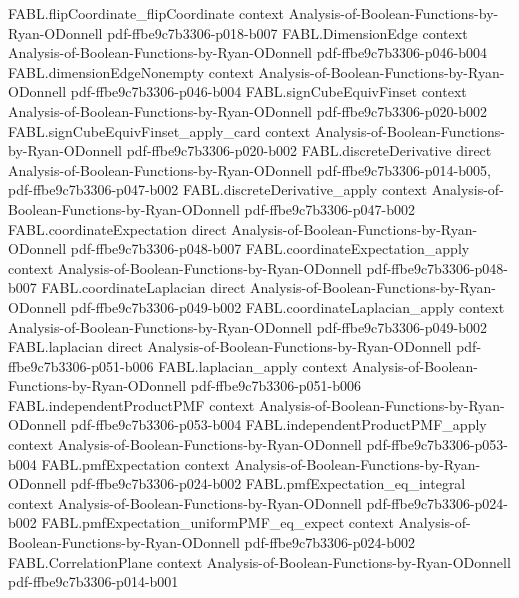 \begin{theorem}
  {FABL.flipCoordinate_flipCoordinate}
  {context}
  {Analysis-of-Boolean-Functions-by-Ryan-ODonnell}
  {pdf-ffbe9c7b3306-p018-b007}
\proofstep
  {FABL.DimensionEdge}
  {context}
  {Analysis-of-Boolean-Functions-by-Ryan-ODonnell}
  {pdf-ffbe9c7b3306-p046-b004}
\proofstep
  {FABL.dimensionEdgeNonempty}
  {context}
  {Analysis-of-Boolean-Functions-by-Ryan-ODonnell}
  {pdf-ffbe9c7b3306-p046-b004}
\proofstep
  {FABL.signCubeEquivFinset}
  {context}
  {Analysis-of-Boolean-Functions-by-Ryan-ODonnell}
  {pdf-ffbe9c7b3306-p020-b002}
\proofstep
  {FABL.signCubeEquivFinset_apply_card}
  {context}
  {Analysis-of-Boolean-Functions-by-Ryan-ODonnell}
  {pdf-ffbe9c7b3306-p020-b002}
\proofstep
  {FABL.discreteDerivative}
  {direct}
  {Analysis-of-Boolean-Functions-by-Ryan-ODonnell}
  {pdf-ffbe9c7b3306-p014-b005,
    pdf-ffbe9c7b3306-p047-b002}
\proofstep
  {FABL.discreteDerivative_apply}
  {context}
  {Analysis-of-Boolean-Functions-by-Ryan-ODonnell}
  {pdf-ffbe9c7b3306-p047-b002}
\proofstep
  {FABL.coordinateExpectation}
  {direct}
  {Analysis-of-Boolean-Functions-by-Ryan-ODonnell}
  {pdf-ffbe9c7b3306-p048-b007}
\proofstep
  {FABL.coordinateExpectation_apply}
  {context}
  {Analysis-of-Boolean-Functions-by-Ryan-ODonnell}
  {pdf-ffbe9c7b3306-p048-b007}
\proofstep
  {FABL.coordinateLaplacian}
  {direct}
  {Analysis-of-Boolean-Functions-by-Ryan-ODonnell}
  {pdf-ffbe9c7b3306-p049-b002}
\proofstep
  {FABL.coordinateLaplacian_apply}
  {context}
  {Analysis-of-Boolean-Functions-by-Ryan-ODonnell}
  {pdf-ffbe9c7b3306-p049-b002}
\proofstep
  {FABL.laplacian}
  {direct}
  {Analysis-of-Boolean-Functions-by-Ryan-ODonnell}
  {pdf-ffbe9c7b3306-p051-b006}
\proofstep
  {FABL.laplacian_apply}
  {context}
  {Analysis-of-Boolean-Functions-by-Ryan-ODonnell}
  {pdf-ffbe9c7b3306-p051-b006}
\proofstep
  {FABL.independentProductPMF}
  {context}
  {Analysis-of-Boolean-Functions-by-Ryan-ODonnell}
  {pdf-ffbe9c7b3306-p053-b004}
\proofstep
  {FABL.independentProductPMF_apply}
  {context}
  {Analysis-of-Boolean-Functions-by-Ryan-ODonnell}
  {pdf-ffbe9c7b3306-p053-b004}
\proofstep
  {FABL.pmfExpectation}
  {context}
  {Analysis-of-Boolean-Functions-by-Ryan-ODonnell}
  {pdf-ffbe9c7b3306-p024-b002}
\proofstep
  {FABL.pmfExpectation_eq_integral}
  {context}
  {Analysis-of-Boolean-Functions-by-Ryan-ODonnell}
  {pdf-ffbe9c7b3306-p024-b002}
\proofstep
  {FABL.pmfExpectation_uniformPMF_eq_expect}
  {context}
  {Analysis-of-Boolean-Functions-by-Ryan-ODonnell}
  {pdf-ffbe9c7b3306-p024-b002}
\proofstep
  {FABL.CorrelationPlane}
  {context}
  {Analysis-of-Boolean-Functions-by-Ryan-ODonnell}
  {pdf-ffbe9c7b3306-p014-b001}

\end{theorem}
